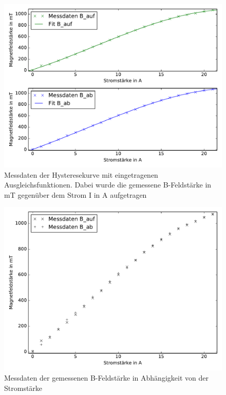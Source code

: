 \begin{figure}
  \centering
  \includegraphics[width=\textwidth]{Python/Hysterese.pdf}
  \caption{Messdaten der Hysteresekurve mit eingetragenen Ausgleichsfunktionen.
  Dabei wurde die gemessene B-Feldstärke in mT gegenüber dem Strom I in A aufgetragen}
  \label{fig:Hysterese}
\end{figure}

\begin{figure}
  \centering
  \includegraphics[width=\textwidth]{Python/Hysterese_Messdaten.pdf}
  \caption{Messdaten der gemessenen B-Feldstärke in Abhängigkeit von der Stromstärke}
  \label{fig:Hysterese_Messdaten}
\end{figure}

